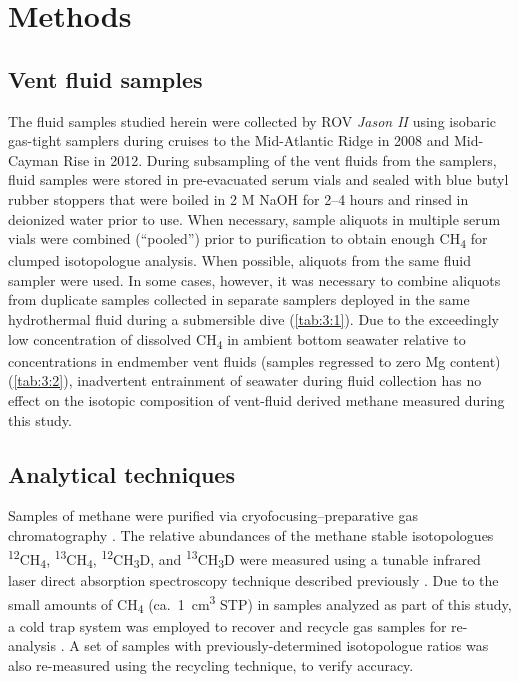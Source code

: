 \section{Methods}\label{methods}

\subsection{Vent fluid samples}\label{vent-fluid-samples}

The fluid samples studied herein were collected by ROV \emph{Jason II}
using isobaric gas-tight samplers \parencite{Seewald++_2002_DSR} during cruises
to the Mid-Atlantic Ridge in 2008 and Mid-Cayman Rise in 2012. During
subsampling of the vent fluids from the samplers, fluid samples were
stored in pre-evacuated serum vials and sealed with blue butyl rubber
stoppers that were boiled in 2 M NaOH for 2--4 hours and rinsed in
deionized water prior to use. When necessary, sample aliquots in
multiple serum vials were combined (``pooled'') prior to purification to
obtain enough CH\textsubscript{4} for clumped isotopologue analysis.
When possible, aliquots from the same fluid sampler were used. In some
cases, however, it was necessary to combine aliquots from duplicate
samples collected in separate samplers deployed in the same hydrothermal
fluid during a submersible dive (\autoref{tab:3:1}). Due to the exceedingly low
concentration of dissolved CH\textsubscript{4} in ambient bottom
seawater \parencite[\textless{}10\textsuperscript{$-$8}~M,][]{McDermott++_2015_PNAS,Reeves++_2014_PNAS} relative to concentrations in endmember vent fluids
(samples regressed to zero Mg content) (\autoref{tab:3:2}), inadvertent
entrainment of seawater during fluid collection has no effect on the
isotopic composition of vent-fluid derived methane measured during this
study.

\subsection{Analytical techniques}\label{analytical-techniques}

Samples of methane were purified via cryofocusing--preparative gas
chromatography \parencite{Wang++_2015_S}. The relative abundances of the
methane stable isotopologues \textsuperscript{12}CH\textsubscript{4},
\textsuperscript{13}CH\textsubscript{4},
\textsuperscript{12}CH\textsubscript{3}D, and
\textsuperscript{13}CH\textsubscript{3}D were measured using a tunable
infrared laser direct absorption spectroscopy technique described
previously \parencite{Ono++_2014_AC,Wang++_2015_S}. Due to the small
amounts of CH\textsubscript{4} (ca.\ 1~cm\textsuperscript{3} STP) in
samples analyzed as part of this study, a cold trap system was employed
to recover and recycle gas samples for re-analysis \parencite{Wang++_2015_S}.
A set of samples with previously-determined isotopologue ratios was also
re-measured using the recycling technique, to verify accuracy.

